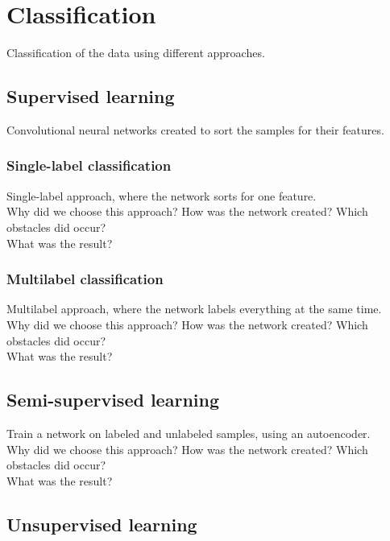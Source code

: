\section{Classification}

Classification of the data using different approaches.

\subsection{Supervised learning}

Convolutional neural networks created to sort the samples for their features.

\subsubsection{Single-label classification}

Single-label approach, where the network sorts for one feature. \\
Why did we choose this approach? How was the network created? Which obstacles did occur?\\
What was the result?

\subsubsection{Multilabel classification}

Multilabel approach, where the network labels everything at the same time. \\
Why did we choose this approach? How was the network created? Which obstacles did occur?\\ What was the result?

\subsection{Semi-supervised learning}

Train a network on labeled and unlabeled samples, using an autoencoder. \\
Why did we choose this approach? How was the network created? Which obstacles did occur?\\ What was the result?

\subsection{Unsupervised learning}

